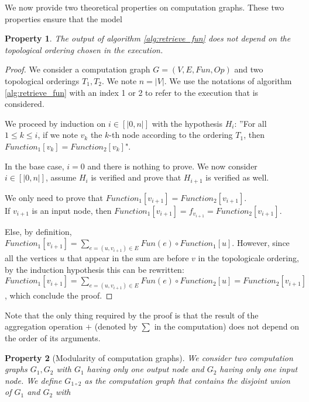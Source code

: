 \documentclass[11pt,a4paper]{article}
\newcommand{\Sum}[2]{\overset{#2}{\underset{#1}{\sum}}}
\newtheorem{property}{Property}
\theoremstyle{definition}
\renewcommand{\leq}{\leqslant}
\begin{document}
We now provide two theoretical properties on computation graphs. These two properties ensure that the model 

\begin{property}
	The output of algorithm \ref{alg:retrieve_fun} does not depend on the topological ordering chosen in the execution.
\end{property}

\begin{proof}

	We consider a computation graph $G = (V,E,Fun,Op)$ and two topological orderings $T_1 ,T_2$. We note $n = |V|$. We use the notations of algorithm \ref{alg:retrieve_fun} with an index 1 or 2 to refer to the execution that is considered.
	
	 We proceed by induction on $i \in [|0,n|]$ with the hypothesis $H_i$: ''For all $1 \leq k \leq i$, if we note $v_k$ the $k$-th node according to the ordering $T_1$, then $Function_1[v_k]=Function_2[v_k]$".
	 
	 In the base case, $i=0$ and there is nothing to prove. We now consider $i \in [|0,n|]$, assume $H_i$ is verified and prove that $H_{i+1}$ is verified as well.
	 
	 We only need to prove that $Function_1[v_{i+1}]=Function_2[v_{i+1}]$.\\
	 
	 If $v_{i+1}$ is an input node, then $Function_1[v_{i+1}]=f_{v_{i+1}}=Function_2[v_{i+1}]$.
	 
	 Else, by definition, $Function_1[v_{i+1}]=\Sum{e=(u,v_{i+1}) \in E}{} Fun(e) \circ Function_1[u]$. However, since all the vertices $u$ that appear in the sum are before $v$ in the topologicale ordering, by the induction hypothesis this can be rewritten: $Function_1[v_{i+1}]=\Sum{e=(u,v_{i+1}) \in E}{} Fun(e) \circ Function_2[u]=Function_2[v_{i+1}]$, which conclude the proof.
\end{proof}

Note that the only thing required by the proof is that the result of the aggregation operation $+$ (denoted by $\sum$ in the computation) does not depend on the order of its arguments.\\

\begin{property}[Modularity of computation graphs]
	We consider two computation graphs $G_1,G_2$ with $G_1$ having only one output node and $G_2$ having only one input node. We define $G_{1 \circ 2}$ as the computation graph that contains the disjoint union of $G_1$ and $G_2$ with 
\end{property}
\end{document}
